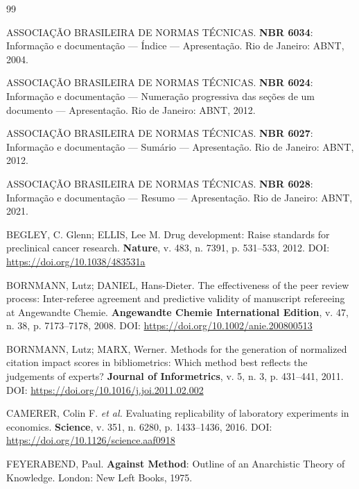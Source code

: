 \begin{thebibliography}{99}

ASSOCIAÇÃO BRASILEIRA DE NORMAS TÉCNICAS.
\textbf{NBR 6034}: Informação e documentação — Índice — Apresentação.
Rio de Janeiro: ABNT, 2004.

ASSOCIAÇÃO BRASILEIRA DE NORMAS TÉCNICAS.
\textbf{NBR 6024}: Informação e documentação — Numeração progressiva das
seções de um documento — Apresentação.
Rio de Janeiro: ABNT, 2012.

ASSOCIAÇÃO BRASILEIRA DE NORMAS TÉCNICAS.
\textbf{NBR 6027}: Informação e documentação — Sumário — Apresentação.
Rio de Janeiro: ABNT, 2012.

ASSOCIAÇÃO BRASILEIRA DE NORMAS TÉCNICAS.
\textbf{NBR 6028}: Informação e documentação — Resumo — Apresentação.
Rio de Janeiro: ABNT, 2021.

BEGLEY, C. Glenn; ELLIS, Lee M.
Drug development: Raise standards for preclinical cancer research.
\textbf{Nature}, v. 483, n. 7391, p. 531--533, 2012.
DOI: \url{https://doi.org/10.1038/483531a}

BORNMANN, Lutz; DANIEL, Hans-Dieter.
The effectiveness of the peer review process: Inter-referee
agreement and predictive validity of manuscript refereeing at
Angewandte Chemie.
\textbf{Angewandte Chemie International Edition}, v. 47, n. 38,
p. 7173--7178, 2008.
DOI: \url{https://doi.org/10.1002/anie.200800513}

BORNMANN, Lutz; MARX, Werner.
Methods for the generation of normalized citation impact scores in
bibliometrics: Which method best reflects the judgements of
experts?
\textbf{Journal of Informetrics}, v. 5, n. 3, p. 431--441, 2011.
DOI: \url{https://doi.org/10.1016/j.joi.2011.02.002}

CAMERER, Colin F. \textit{et al.}
Evaluating replicability of laboratory experiments in economics.
\textbf{Science}, v. 351, n. 6280, p. 1433--1436, 2016.
DOI: \url{https://doi.org/10.1126/science.aaf0918}

FEYERABEND, Paul.
\textbf{Against Method}: Outline of an Anarchistic Theory of Knowledge.
London: New Left Books, 1975.


\end{thebibliography}
